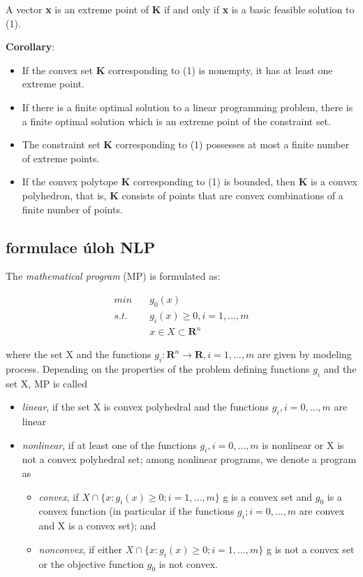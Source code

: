 A vector \textbf{x} is an extreme point of \textbf{K} if and only if \textbf{x} is a basic feasible solution
to (1).

\textbf{Corollary}:
\begin{itemize}
\item If the convex set \textbf{K} corresponding to (1) is nonempty, it has at
least one extreme point.
\item If there is a finite optimal solution to a linear programming
problem, there is a finite optimal solution which is an extreme point of the
constraint set.
\item The constraint set \textbf{K} corresponding to (1) possesses at most a
finite number of extreme points.
\item If the convex polytope \textbf{K} corresponding to (1) is bounded, then \textbf{K}
is a convex polyhedron, that is, \textbf{K} consists of points that are convex
combinations of a finite number of points.
\end{itemize}




\subsection{formulace úloh NLP}

The \textit{mathematical program} (MP) is formulated as:

\begin{align*}
min \quad&  g_{0}(x) \\
s.t.\quad &  g_{i}(x) \geq 0, i=1,...,m\\
&  x \in X \subset \mathbf{R}^{n}
\end{align*}

where the set X and the functions $g_{i}: \mathbf{R}^n \rightarrow \mathbf{R}, i=1,...,m$ are given by modeling process. Depending on the properties of the problem defining functions $g_{i}$ and the
set X, MP is called
\begin{itemize}
\item \textit{linear}, if the set X is convex polyhedral and the functions $g_{i}, i = 0,...,m$
are linear
\item \textit{nonlinear}, if at least one of the functions $g_{i}, i = 0,...,m$ is nonlinear or
X is not a convex polyhedral set; among nonlinear programs, we denote
a program as
\begin{itemize}
\item \textit{convex}, if $X \cap \{x: g_{i}(x) \geq  0; i = 1, ..., m\}$ g is a convex set and $g_{0}$ is
a convex function (in particular if the functions $g_{i}; i = 0, ..., m$ are
convex and X is a convex set); and
\item \textit{nonconvex}, if either $X \cap \{x: g_{i}(x) \geq  0; i = 1, ..., m\}$ g is not a convex
set or the objective function $g_{0}$ is not convex.
\end{itemize}
\end{itemize}


